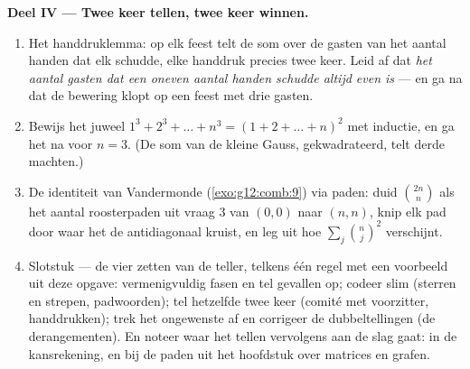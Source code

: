 \begin{problem}
\medskip
\noindent\textbf{Deel IV --- Twee keer tellen, twee keer winnen.}
\begin{enumerate}[resume]
  \item Het handdruklemma: op elk feest telt de som over de gasten van het
        aantal handen dat elk schudde, elke handdruk precies twee keer. Leid
        af dat \emph{het aantal gasten dat een oneven aantal handen schudde
        altijd even is} --- en ga na dat de bewering klopt op een feest met
        drie gasten.
  \item Bewijs het juweel $1^3 + 2^3 + \dots + n^3 = (1 + 2 + \dots + n)^2$
        met inductie, en ga het na voor $n = 3$. (De som van de kleine Gauss,
        gekwadrateerd, telt derde machten.)
  \item De identiteit van Vandermonde (\cref{exo:g12:comb:9}) via paden: duid
        $\binom{2n}{n}$ als het aantal roosterpaden uit vraag 3 van $(0,0)$
        naar $(n,n)$, knip elk pad door waar het de antidiagonaal kruist, en
        leg uit hoe $\sum_j \binom nj^2$ verschijnt.
  \item Slotstuk --- de vier zetten van de teller, telkens één regel met een
        voorbeeld uit deze opgave: vermenigvuldig fasen en tel gevallen op;
        codeer slim (sterren en strepen, padwoorden); tel hetzelfde twee keer
        (comité met voorzitter, handdrukken); trek het ongewenste af en
        corrigeer de dubbeltellingen (de derangementen). En noteer waar het
        tellen vervolgens aan de slag gaat: in de kansrekening, en bij de
        paden uit het hoofdstuk over matrices en grafen.
\end{enumerate}
\end{problem}
